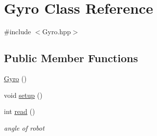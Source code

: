\hypertarget{classGyro}{\section{Gyro Class Reference}
\label{classGyro}
}


{\ttfamily \#include $<$Gyro.\-hpp$>$}

\subsection*{Public Member Functions}
\begin{DoxyCompactItemize}
\item 
\hyperlink{classGyro_a8ff2fdb2417c677f4694fa23fc0ce6da}{Gyro} ()
\item 
void \hyperlink{classGyro_aab09f758425de1758f284853712cb18b}{setup} ()
\item 
int \hyperlink{classGyro_a8bf35077e5f6237629e093c67a0bb1d9}{read} ()
\begin{DoxyCompactList}\small\item\em angle of robot \end{DoxyCompactList}\end{DoxyCompactItemize}
